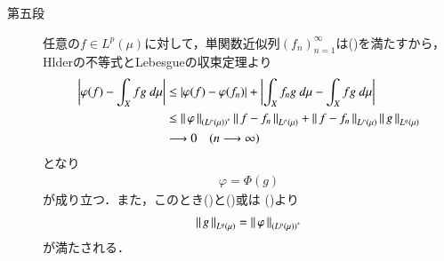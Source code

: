 \begin{prf}
\begin{description}
			\item[第五段]
				任意の$f \in L^p(\mu)$に対して，単関数近似列$(f_n)_{n=1}^\infty$は()を満たすから，
				Hlderの不等式とLebesgueの収束定理より
				\begin{align}
					\left| \varphi(f) - \int_X fg\ d\mu \right|
					&\leq \left| \varphi(f) - \varphi(f_n) \right| + \left| \int_X f_ng\ d\mu - \int_X fg\ d\mu \right| \\
					&\leq \left\|\, \varphi\, \right\|_{\left( L^p(\mu) \right)^*} \left\|\, f - f_n\, \right\|_{L^p(\mu)}
						+ \left\|\, f - f_n\, \right\|_{L^p(\mu)}\left\|\, g\, \right\|_{L^q(\mu)} \\
					&\longrightarrow 0 \quad (n \longrightarrow \infty)
				\end{align}
				となり
				\begin{align}
					\varphi = \Phi(g)
				\end{align}
				が成り立つ．また，このとき()と()或は
				()より
				\begin{align}
					\left\|\, g\, \right\|_{L^q(\mu)} = \left\|\, \varphi\, \right\|_{\left( L^p(\mu) \right)^*}
				\end{align}
				が満たされる．
				

\end{description}
\end{prf}
